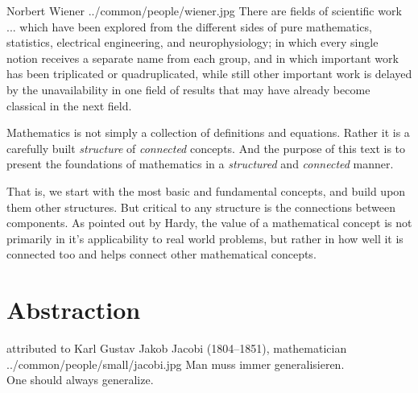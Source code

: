 \qboxnps
  {Norbert Wiener}
  {../common/people/wiener.jpg}
  {There are fields of scientific work ... which have been explored from the different sides of
   pure mathematics, statistics, electrical engineering, and neurophysiology;
   in which every single notion receives a separate name from each group,
   and in which important work has been triplicated or quadruplicated,
   while still other important work is delayed by the unavailability in one field of results that
   may have already become classical in the next field.}

Mathematics is not simply a collection of definitions and equations.
Rather it is a carefully built \emph{structure} of \emph{connected} concepts.
And the purpose of this text is to present the foundations of mathematics
in a {\em structured} and {\em connected} manner.

That is, we start with the most basic and fundamental concepts,
and build upon them other structures.
But critical to any structure is the connections between components.
As pointed out by Hardy, the value of a mathematical concept is not primarily in
it's applicability to real world problems,
but rather in how well it is connected too and helps connect other mathematical concepts.

\section*{Abstraction}
\qboxnps
  { attributed to Karl Gustav Jakob Jacobi (1804--1851), mathematician
    \footnotemark
  }
  {../common/people/small/jacobi.jpg}
  {Man muss immer generalisieren.\quotec \\
   \quoteo One should always generalize.}

